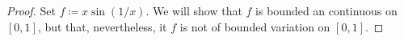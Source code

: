 \begin{proof}
Set $f\coloneqq x\sin(1/x)$. We will show that $f$ is bounded an continuous
on $[0,1]$, but that, nevertheless, it $f$ is not of bounded variation on
$[0,1]$.


\end{proof}

